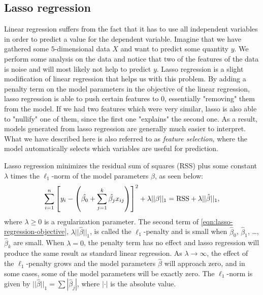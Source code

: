 \subsection{Lasso regression}
\label{sec:lasso-regression}
Linear regression suffers from the fact that it has to use all independent variables in order to predict a value for the dependent variable. Imagine that we have gathered some $5$-dimensional data $X$ and want to predict some quantity $y$. We perform some analysis on the data and notice that two of the features of the data is noise and will most likely not help to predict $y$. Lasso regression is a slight modification of linear regression that helps us with this problem. By adding a penalty term on the model parameters in the objective of the linear regression, lasso regression is able to push certain features to 0, essentially "removing" them from the model. If we had two features which were very similar, lasso is also able to "nullify" one of them, since the first one "explains" the second one. As a result, models generated from lasso regression are generally much easier to interpret. What we have described here is also referred to as \textit{feature selection}, where the model automatically selects which variables are useful for prediction.

Lasso regression minimizes the residual sum of squares (RSS) plus some constant $\lambda$ times the $\ell_1$-norm of the model parameters $\beta$, as seen below:
\begin{align}
    \sum\limits_{i=1}^{n}{\left[y_i - \left(\hat{\beta_0} +  \sum\limits_{j=1}^{k}{\hat{\beta_j}x_{ij}}\right)\right]^2} + \lambda ||\beta||_1 = \text{RSS} + \lambda ||\hat{\beta}||_1,
    \label{eqn:lasso-regression-objective}
\end{align}
where $\lambda \geq 0$ is a regularization parameter. The second term of \cref{eqn:lasso-regression-objective}, $\lambda ||\hat{\beta}||_1$, is called the $\ell_1$-penalty and is small when $\hat{\beta}_0$, $\hat{\beta}_1$, \ldots, $\hat{\beta}_k$ are small. When $\lambda = 0$, the penalty term has no effect and lasso regression will produce the same result as standard linear regression. As $\lambda \rightarrow \infty$, the effect of the $\ell_1$-penalty grows and the model parameters $\hat{\beta}$ will approach zero, and in some cases, some of the model parameters will be exactly zero. The $\ell_1$-norm is given by $||\hat{\beta}||_1 = \sum |\hat{\beta}_j|$, where $|\cdot|$ is the absolute value.

